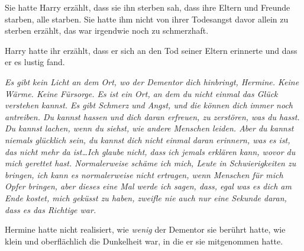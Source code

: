 Sie hatte Harry erzählt, dass sie ihn sterben sah, dass ihre Eltern und Freunde starben, alle starben. Sie hatte ihm nicht von ihrer Todesangst davor allein zu sterben erzählt, das war irgendwie noch zu schmerzhaft.

Harry hatte ihr erzählt, dass er sich an den Tod seiner Eltern erinnerte und dass er es lustig fand.

\emph{Es gibt kein Licht an dem Ort, wo der Dementor dich hinbringt, Hermine. Keine Wärme. Keine Fürsorge. Es ist ein Ort, an dem du nicht einmal das Glück verstehen kannst. Es gibt Schmerz und Angst, und die können dich immer noch antreiben. Du kannst hassen und dich daran erfreuen, zu zerstören, was du hasst. Du kannst lachen, wenn du siehst, wie andere Menschen leiden. Aber du kannst niemals glücklich sein, du kannst dich nicht einmal daran erinnern, was es ist, das nicht mehr da ist…Ich glaube nicht, dass ich jemals erklären kann, wovor du mich gerettet hast. Normalerweise schäme ich mich, Leute in Schwierigkeiten zu bringen, ich kann es normalerweise nicht ertragen, wenn Menschen für mich Opfer bringen, aber dieses eine Mal werde ich sagen, dass, egal was es dich am Ende kostet, mich geküsst zu haben, zweifle nie auch nur eine Sekunde daran, dass es das Richtige war.}

Hermine hatte nicht realisiert, wie \emph{wenig} der Dementor sie berührt hatte, wie klein und oberflächlich die Dunkelheit war, in die er sie mitgenommen hatte.

